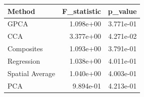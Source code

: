 \begin{tabular}{lrr}
\toprule
Method & F_statistic & p_value \\
\midrule
GPCA & 1.098e+00 & 3.771e-01 \\
CCA & 3.377e+00 & 4.271e-02 \\
Composites & 1.093e+00 & 3.791e-01 \\
Regression & 1.038e+00 & 4.011e-01 \\
Spatial Average & 1.040e+00 & 4.003e-01 \\
PCA & 9.894e-01 & 4.213e-01 \\
\bottomrule
\end{tabular}
